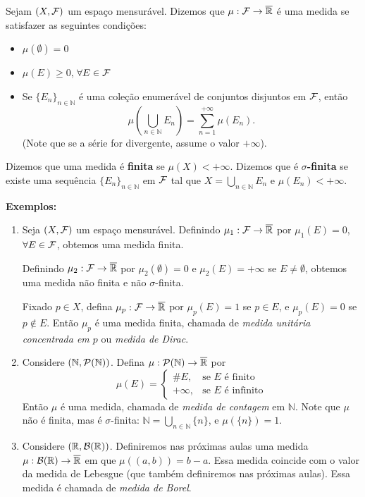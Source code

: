 \begin{definition*}{}
Sejam $(X, \mathcal{F})$ um espaço mensurável. Dizemos que $\mu: \mathcal{F} \rightarrow \overline{\mathbb{R}}$ é uma medida se satisfazer as seguintes condições:
\begin{itemize}
    \item[i)] $\mu(\emptyset) = 0$
    \item[ii)] $\mu(E) \ge 0$, $\forall E \in \mathcal{F}$
    \item[iii)]  Se $\{E_n\}_{n \in \mathbb{N}}$ é uma coleção enumerável de conjuntos disjuntos em $\mathcal{F}$, então 
    $$ \mu\left(\bigcup_{n \in \mathbb{N}} E_n\right) = \sum_{n=1}^{+\infty} \mu(E_n). $$
    (Note que se a série for divergente, assume o valor $+\infty$).
\end{itemize}
\end{definition*}

Dizemos que uma medida é \textbf{finita} se $\mu(X) < +\infty$. Dizemos que é \textbf{$\sigma$-finita} se existe uma sequência $\{E_n\}_{n \in \mathbb{N}}$ em $\mathcal{F}$ tal que $X = \bigcup_{n \in \mathbb{N}} E_n$ e $\mu(E_n) < +\infty$.

\vspace{5mm}
\noindent\textbf{Exemplos:}
\begin{enumerate}
    \item[1)] Seja $(X, \mathcal{F})$ um espaço mensurável. Definindo $\mu_1 : \mathcal{F} \rightarrow \overline{\mathbb{R}}$ por $\mu_1(E) = 0$, $\forall E \in \mathcal{F}$, obtemos uma medida finita. 
    
    Definindo $\mu_2 : \mathcal{F} \rightarrow \overline{\mathbb{R}}$ por $\mu_2(\emptyset) = 0$ e $\mu_2(E) = +\infty$ se $E \neq \emptyset$, obtemos uma medida não finita e não $\sigma$-finita.
    
    Fixado $p \in X$, defina $\mu_p : \mathcal{F} \rightarrow \overline{\mathbb{R}}$ por $\mu_p(E) = 1$ se $p \in E$, e $\mu_p(E) = 0$ se $p \notin E$. Então $\mu_p$ é uma medida finita, chamada de \textit{medida unitária concentrada em $p$} ou \textit{medida de Dirac}.
    
    \item[2)] Considere $(\mathbb{N}, \mathcal{P}(\mathbb{N}))$. Defina $\mu : \mathcal{P}(\mathbb{N}) \rightarrow \overline{\mathbb{R}}$ por
    $$ \mu(E) = \begin{cases} 
    \# E, & \text{se } E \text{ é finito} \\ 
    +\infty, & \text{se } E \text{ é infinito} 
    \end{cases} $$
    Então $\mu$ é uma medida, chamada de \textit{medida de contagem} em $\mathbb{N}$. Note que $\mu$ não é finita, mas é $\sigma$-finita: $\mathbb{N} = \bigcup_{n \in \mathbb{N}} \{n\}$, e $\mu(\{n\}) = 1$.
    
    \item[3)] Considere $(\mathbb{R}, \mathcal{B}(\mathbb{R}))$. Definiremos nas próximas aulas uma medida $\mu: \mathcal{B}(\mathbb{R}) \rightarrow \overline{\mathbb{R}}$ em que $\mu((a,b)) = b - a$. Essa medida coincide com o valor da medida de Lebesgue (que também definiremos nas próximas aulas). Essa medida é chamada de \textit{medida de Borel}.
\end{enumerate}

